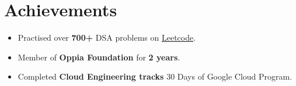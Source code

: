 \documentclass[letterpaper,1pt]{article}
\begin{document}
% 

\section{Achievements}
\begin{itemize}[leftmargin=*, itemsep=1pt, parsep=0pt]
      \selectfont\small
      \setlength\itemsep{0em}
      \setlength\parsep{0em}
      \item Practised over \textbf{700+} DSA problems on \href{https://leetcode.com/u/nycstriker01/}{Leetcode}.
      \item Member of \textbf{Oppia Foundation} for \textbf{2 years}.
      \item Completed \textbf{Cloud Engineering tracks} 30 Days of Google Cloud Program.
\end{itemize}




%
\end{document}
